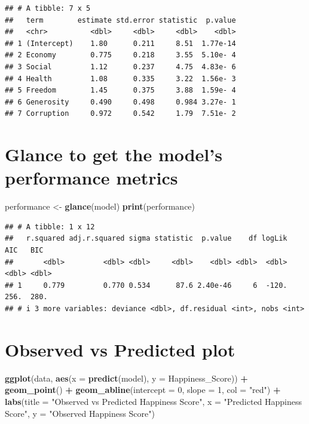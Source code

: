 \documentclass[
  11pt,
]{article}
\newenvironment{Shaded}{\begin{snugshade}}{\end{snugshade}}
\newcommand{\AttributeTok}[1]{\textcolor[rgb]{0.13,0.29,0.53}{#1}}
\newcommand{\DecValTok}[1]{\textcolor[rgb]{0.00,0.00,0.81}{#1}}
\newcommand{\FunctionTok}[1]{\textcolor[rgb]{0.13,0.29,0.53}{\textbf{#1}}}
\newcommand{\NormalTok}[1]{#1}
\newcommand{\OtherTok}[1]{\textcolor[rgb]{0.56,0.35,0.01}{#1}}
\newcommand{\SpecialCharTok}[1]{\textcolor[rgb]{0.81,0.36,0.00}{\textbf{#1}}}
\newcommand{\StringTok}[1]{\textcolor[rgb]{0.31,0.60,0.02}{#1}}
\begin{document}
\begin{verbatim}
## # A tibble: 7 x 5
##   term        estimate std.error statistic  p.value
##   <chr>          <dbl>     <dbl>     <dbl>    <dbl>
## 1 (Intercept)    1.80      0.211     8.51  1.77e-14
## 2 Economy        0.775     0.218     3.55  5.10e- 4
## 3 Social         1.12      0.237     4.75  4.83e- 6
## 4 Health         1.08      0.335     3.22  1.56e- 3
## 5 Freedom        1.45      0.375     3.88  1.59e- 4
## 6 Generosity     0.490     0.498     0.984 3.27e- 1
## 7 Corruption     0.972     0.542     1.79  7.51e- 2
\end{verbatim}

\section{Glance to get the model's performance
metrics}\label{glance-to-get-the-models-performance-metrics}

\begin{Shaded}
\begin{Highlighting}[]
\NormalTok{performance }\OtherTok{\textless{}{-}} \FunctionTok{glance}\NormalTok{(model)}
\FunctionTok{print}\NormalTok{(performance)}
\end{Highlighting}
\end{Shaded}

\begin{verbatim}
## # A tibble: 1 x 12
##   r.squared adj.r.squared sigma statistic  p.value    df logLik   AIC   BIC
##       <dbl>         <dbl> <dbl>     <dbl>    <dbl> <dbl>  <dbl> <dbl> <dbl>
## 1     0.779         0.770 0.534      87.6 2.40e-46     6  -120.  256.  280.
## # i 3 more variables: deviance <dbl>, df.residual <int>, nobs <int>
\end{verbatim}

\section{Observed vs Predicted plot}\label{observed-vs-predicted-plot}

\begin{Shaded}
\begin{Highlighting}[]
\FunctionTok{ggplot}\NormalTok{(data, }\FunctionTok{aes}\NormalTok{(}\AttributeTok{x =} \FunctionTok{predict}\NormalTok{(model), }\AttributeTok{y =}\NormalTok{ Happiness\_Score)) }\SpecialCharTok{+}
  \FunctionTok{geom\_point}\NormalTok{() }\SpecialCharTok{+}
  \FunctionTok{geom\_abline}\NormalTok{(}\AttributeTok{intercept =} \DecValTok{0}\NormalTok{, }\AttributeTok{slope =} \DecValTok{1}\NormalTok{, }\AttributeTok{col =} \StringTok{"red"}\NormalTok{) }\SpecialCharTok{+}
  \FunctionTok{labs}\NormalTok{(}\AttributeTok{title =} 
         \StringTok{"Observed vs Predicted Happiness Score"}\NormalTok{, }
       \AttributeTok{x =} \StringTok{"Predicted Happiness Score"}\NormalTok{, }
       \AttributeTok{y =} \StringTok{"Observed Happiness Score"}\NormalTok{)}
\end{Highlighting}
\end{Shaded}
\end{document}
